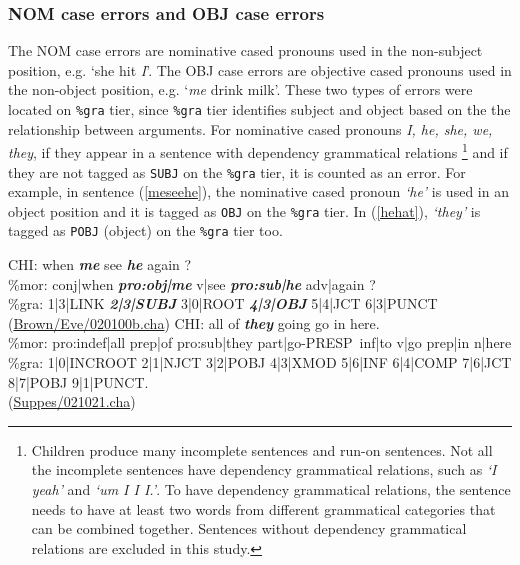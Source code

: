 \subsubsection{NOM case errors and OBJ case errors}
The NOM case errors are nominative cased pronouns used in the non-subject position, e.g. `she hit \textit{I}'. The OBJ case errors are objective cased pronouns used in the non-object position, e.g. `\textit{me} drink milk'. These two types of errors were located on \texttt{\%gra} tier, since \texttt{\%gra} tier identifies subject and object based on the the relationship between arguments. For nominative cased pronouns \textit{I, he, she, we, they}, if they appear in a sentence with dependency grammatical relations \footnote{Children produce many incomplete sentences and run-on sentences. Not all the incomplete sentences have dependency grammatical relations, such as \textit{`I yeah'} and \textit{`um I I I.'}. To have dependency grammatical relations, the sentence needs to have at least two words from different grammatical categories that can be combined together. Sentences without dependency grammatical relations are excluded in this study.} 
and if they are not tagged as \texttt{SUBJ} on the \texttt{\%gra} tier, it is counted as an error. For example, in sentence (\ref{meseehe}), the nominative cased pronoun \textit{`he'} is used in an object position and it is tagged as \texttt{OBJ} on the \texttt{\%gra} tier. In (\ref{hehat}), \textit{`they'} is tagged as \texttt{POBJ} (object) on the \texttt{\%gra} tier too. 
\begin{exe}
\ex \label{meseehe}\gll *CHI: when \textit{\textbf{me}} see \textit{\textbf{he}} again ?\\
\%mor: conj|when \textit{\textbf{pro:obj|me}} v|see \textit{\textbf{pro:sub|he}} adv|again ? \\
\%gra: 1|3|LINK \textbf{\textit{2|3|SUBJ}} 3|0|ROOT \textit{\textbf{4|3|OBJ}} 5|4|JCT 6|3|PUNCT \\
(\href{https://childes.talkbank.org/browser/index.php?url=Eng-NA/Brown/Eve/020100b.cha}{Brown/Eve/020100b.cha})
\ex \label{hehat}\gll *CHI: all of \textit{\textbf{they}} going go in here.\\
\%mor: pro:indef|all prep|of pro:sub|they part|go-PRESP~inf|to v|go prep|in n|here\\
\%gra: 1|0|INCROOT 2|1|NJCT 3|2|POBJ 4|3|XMOD 5|6|INF 6|4|COMP 7|6|JCT 8|7|POBJ 9|1|PUNCT.\\
(\href{https://childes.talkbank.org/browser/index.php?url=Eng-NA/Suppes/021021.cha}{Suppes/021021.cha})
\end{exe}
